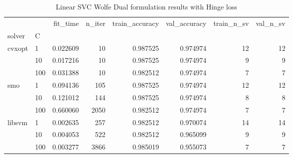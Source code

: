 \begin{table}[H]
\centering
\caption{Linear SVC Wolfe Dual formulation results with Hinge loss}
\label{linear_dual_svc_cv_results}
\begin{tabular}{llrrrrrr}
\toprule
       &     &  fit\_time &  n\_iter &  train\_accuracy &  val\_accuracy &  train\_n\_sv &  val\_n\_sv \\
solver & C &           &         &                 &               &             &           \\
\midrule
cvxopt & 1   &  0.022609 &      10 &        0.987525 &      0.974974 &          12 &        12 \\
       & 10  &  0.017216 &      10 &        0.987525 &      0.974974 &           9 &         9 \\
       & 100 &  0.031388 &      10 &        0.982512 &      0.974974 &           7 &         7 \\
smo & 1   &  0.094136 &     105 &        0.987525 &      0.974974 &          12 &        12 \\
       & 10  &  0.121012 &     144 &        0.987525 &      0.974974 &           8 &         8 \\
       & 100 &  0.660060 &    2050 &        0.982512 &      0.974974 &           7 &         7 \\
libsvm & 1   &  0.002635 &     257 &        0.982512 &      0.970074 &          14 &        14 \\
       & 10  &  0.004053 &     522 &        0.982512 &      0.965099 &           9 &         9 \\
       & 100 &  0.003277 &    3866 &        0.985019 &      0.955073 &           7 &         7 \\
\bottomrule
\end{tabular}
\end{table}
